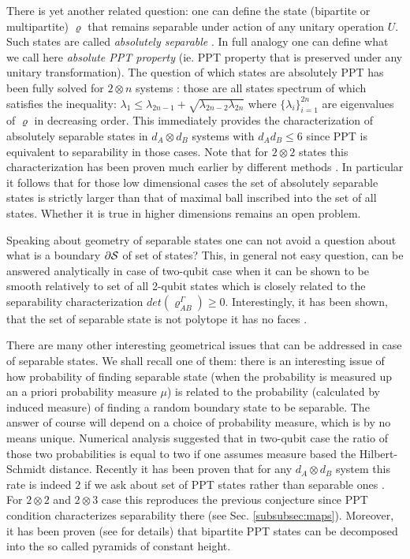 \documentclass[rmp,12pt,preprint]{revtex4-2}
\begin{document}
There is yet another related question: one can define the state
(bipartite or multipartite) $\varrho$ that remains separable under
action of any unitary operation $U$. Such states are called {\it
absolutely separable} \cite{2qOrbitsKus}. In full analogy one can
define what we call here {\it absolute PPT property} (ie. PPT
property that is preserved under any unitary transformation). The
question of which states are absolutely PPT has been fully solved
for $2 \otimes n$ systems \cite{AbsolutePPT}: those are all states
spectrum of which satisfies the inequality: $\lambda_{1}\leq
\lambda_{2n-1} + \sqrt{\lambda_{2n-2}\lambda_{2n}}$ where $\{
\lambda_{i} \}_{i=1}^{2n}$ are eigenvalues of $\varrho$ in
decreasing order. This immediately provides the characterization of
absolutely separable states in $d_{A} \otimes d_{B}$ systems with
$d_{A}d_{B}\leq 6$ since PPT is equivalent to separability in those
cases. Note that for $2 \otimes 2 $ states this characterization has
been proven much earlier by different methods \cite{2x2AbsoluteSep}.
In particular it follows that for those low dimensional cases the set
of absolutely separable states is strictly larger than that of
maximal ball inscribed into the set of all states. Whether it is
true in higher dimensions remains an open problem.

Speaking about geometry of separable states one can not avoid a
question about what is a boundary $\partial {\cal S}$ of set of
states? This, in general not easy question, can be answered
analytically in case of two-qubit case when it can be shown to be
smooth \cite{SmoothBoundary} relatively to set of all 2-qubit states
which is closely related to the separability characterization
\cite{Augusiak} $det(\varrho_{AB}^{\Gamma})\geq 0$.
Interestingly, it has been shown, that the set of separable state is not polytope \cite{IoannouT2006}
it has no faces \cite{GuhneL2006}.

There are many other interesting geometrical issues that can be
addressed in case of separable states. We shall recall one of them:
there is an interesting issue of how probability of finding separable
state (when the probability is measured up an a priori probability
measure $\mu$) is related to the probability (calculated by induced
measure) of finding a random boundary state to be separable. The
answer of course will depend on a choice of probability measure, which
is by no means unique.  Numerical analysis suggested
\cite{Slater1,Slater2} that in two-qubit case the ratio of those two
probabilities is equal to two if one assumes measure based the
Hilbert-Schmidt distance. Recently it has been proven that for any
$d_{A}\otimes d_{B}$ system this rate is indeed $2$ if we ask about
set of PPT states rather than separable ones
\cite{SzarekProbabilityPPTBoundary}. For $2\otimes 2$ and $2 \otimes
3$ case this reproduces the previous conjecture since PPT condition
characterizes separability there (see Sec.
\ref{subsubsec:maps}). Moreover, it has been proven (see
\cite{SzarekProbabilityPPTBoundary} for details) that bipartite PPT
states can be decomposed into the so called pyramids of constant
height.
\end{document}
